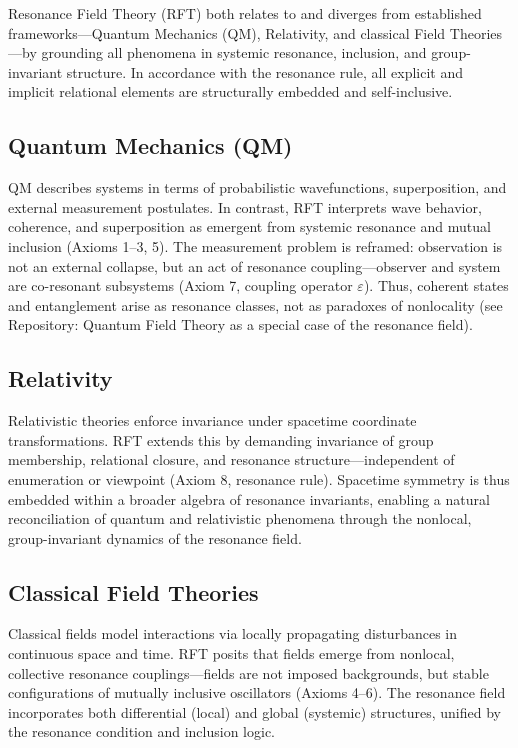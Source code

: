\documentclass[12pt]{iopart}
\begin{document}
Resonance Field Theory (RFT) both relates to and diverges from established frameworks—Quantum Mechanics (QM), Relativity, and classical Field Theories—by grounding all phenomena in systemic resonance, inclusion, and group-invariant structure. In accordance with the resonance rule, all explicit and implicit relational elements are structurally embedded and self-inclusive.

\subsection{Quantum Mechanics (QM)}
QM describes systems in terms of probabilistic wavefunctions, superposition, and external measurement postulates. In contrast, RFT interprets wave behavior, coherence, and superposition as emergent from systemic resonance and mutual inclusion (Axioms 1–3, 5). The measurement problem is reframed: observation is not an external collapse, but an act of resonance coupling—observer and system are co-resonant subsystems (Axiom 7, coupling operator $\varepsilon$). Thus, coherent states and entanglement arise as resonance classes, not as paradoxes of nonlocality (see Repository: Quantum Field Theory as a special case of the resonance field).

\subsection{Relativity}
Relativistic theories enforce invariance under spacetime coordinate transformations. RFT extends this by demanding invariance of group membership, relational closure, and resonance structure—independent of enumeration or viewpoint (Axiom 8, resonance rule). Spacetime symmetry is thus embedded within a broader algebra of resonance invariants, enabling a natural reconciliation of quantum and relativistic phenomena through the nonlocal, group-invariant dynamics of the resonance field.

\subsection{Classical Field Theories}
Classical fields model interactions via locally propagating disturbances in continuous space and time. RFT posits that fields emerge from nonlocal, collective resonance couplings—fields are not imposed backgrounds, but stable configurations of mutually inclusive oscillators (Axioms 4–6). The resonance field incorporates both differential (local) and global (systemic) structures, unified by the resonance condition and inclusion logic.
\end{document}
